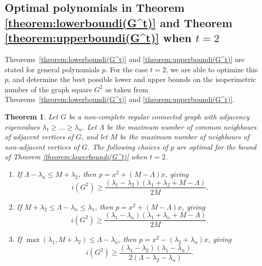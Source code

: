 \documentclass[a4paper,11pt]{article}
\newtheorem{theorem}{Theorem}[section]
\theoremstyle{definition}
\begin{document}
\subsection{Optimal polynomials in Theorem \ref{theorem:lowerboundi(G^t)} and Theorem \ref{theorem:upperboundi(G^t)} when \texorpdfstring{$t=2$}{t=2}}

Theorems~\ref{theorem:lowerboundi(G^t)} and \ref{theorem:upperboundi(G^t)} are stated for general polynomials $p$. For the case $t=2$, we are able to optimize this $p$, and determine the best possible lower and upper bounds on the isoperimetric number of the graph square $G^2$ as taken from Theorems~\ref{theorem:lowerboundi(G^t)} and \ref{theorem:upperboundi(G^t)}.

\begin{theorem}\label{theorem:lowerboundi(G^2)closed}
    Let $G$ be a non-complete regular connected graph with adjacency eigenvalues $\lambda_1\ge \dots \ge \lambda_n$. Let $\Lambda$ be the maximum number of common neighbours of adjacent vertices of $G$, and let $M$ be the maximum number of neighbours of non-adjacent vertices of $G$. The following choices of $p$ are optimal for the bound of Theorem \ref{theorem:lowerboundi(G^t)} when $t=2$.
    \begin{enumerate}
        \item[i.] If $\Lambda-\lambda_n \le M+\lambda_2$, then $p=x^2+(M-\Lambda)x$, giving
        $$i(G^2) \ge \frac{(\lambda_1-\lambda_2)(\lambda_1+\lambda_2+M-\Lambda)}{2M}.$$
        \item[ii.] If $M+\lambda_2 \le \Lambda - \lambda_n \le \lambda_1$, then $p=x^2+(M-\Lambda)x$, giving
        $$i(G^2)\ge \frac{(\lambda_1-\lambda_n)(\lambda_1+\lambda_n+M-\Lambda)}{2M}.$$
        \item[iii.] If $\max(\lambda_1,M+\lambda_2) \le \Lambda-\lambda_n$, then $p=x^2-(\lambda_2+\lambda_n)x$, giving
        $$i(G^2)\ge \frac{(\lambda_1-\lambda_2)(\lambda_1-\lambda_n)}{2(\Lambda-\lambda_2-\lambda_n)}.$$
    \end{enumerate}
\end{theorem}
\end{document}
